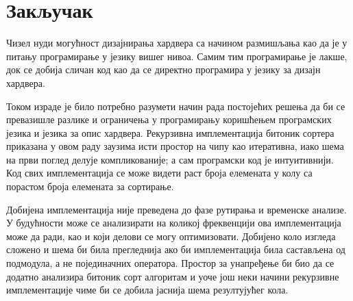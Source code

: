 \documentclass[12pt, a4paper]{article}
\theoremstyle{definition}
\begin{document}
\newpage
\section{Закључак}

Чизел нуди могућност дизајнирања хардвера са начином размишљања као да је у питању програмирање у језику вишег нивоа. Самим тим програмирање је лакше, док се добија сличан код као да се директно програмира у језику за дизајн хардвера.

Током израде је било потребно разумети начин рада постојећих решења да би се превазишле разлике и ограничења у програмирању коришћењем програмских језика и језика за опис хардвера. Рекурзивна имплементација битоник сортера приказана у овом раду заузима исти простор на чипу као итеративна, иако шема на први поглед делује компликованије; а сам програмски код је интуитивнији. Код свих имплементација се може видети раст броја елемената у колу са порастом броја елемената за сортирање.


Добијена имплементација није преведена до фазе рутирања и временске анализе. У будућности може се анализирати на коликој фреквенцији ова имплементација може да ради, као и који делови се могу оптимизовати. Добијено коло изгледа сложено и шема би била прегледнија ако би имплементација била састављена од подмодула, а не појединачних оператора. Простор за унапређење би био да се додатно анализира битоник сорт алгоритам и уоче још неки начини рекурзивне имплементације чиме би се добила јаснија шема резултујућег кола.



\clearpage
\begingroup
\raggedright
%
\end{document}
